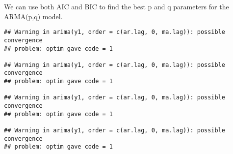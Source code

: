 \documentclass[]{article}
\newenvironment{Shaded}{\begin{snugshade}}{\end{snugshade}}
\newcommand{\AttributeTok}[1]{\textcolor[rgb]{0.77,0.63,0.00}{#1}}
\newcommand{\CommentTok}[1]{\textcolor[rgb]{0.56,0.35,0.01}{\textit{#1}}}
\newcommand{\ControlFlowTok}[1]{\textcolor[rgb]{0.13,0.29,0.53}{\textbf{#1}}}
\newcommand{\DecValTok}[1]{\textcolor[rgb]{0.00,0.00,0.81}{#1}}
\newcommand{\FunctionTok}[1]{\textcolor[rgb]{0.00,0.00,0.00}{#1}}
\newcommand{\NormalTok}[1]{#1}
\newcommand{\OtherTok}[1]{\textcolor[rgb]{0.56,0.35,0.01}{#1}}
\newcommand{\SpecialCharTok}[1]{\textcolor[rgb]{0.00,0.00,0.00}{#1}}
\newcommand{\StringTok}[1]{\textcolor[rgb]{0.31,0.60,0.02}{#1}}
\begin{document}
We can use both AIC and BIC to find the best p and q parameters for the
ARMA(p,q) model.

\begin{Shaded}
\end{Shaded}

\begin{verbatim}
## Warning in arima(y1, order = c(ar.lag, 0, ma.lag)): possible convergence
## problem: optim gave code = 1

## Warning in arima(y1, order = c(ar.lag, 0, ma.lag)): possible convergence
## problem: optim gave code = 1

## Warning in arima(y1, order = c(ar.lag, 0, ma.lag)): possible convergence
## problem: optim gave code = 1

## Warning in arima(y1, order = c(ar.lag, 0, ma.lag)): possible convergence
## problem: optim gave code = 1
\end{verbatim}
\end{document}
